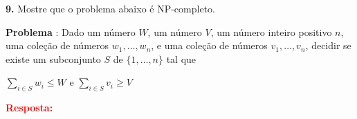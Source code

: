 
\noindent\textbf{9.} Mostre que o problema abaixo é NP-completo.

\indent\textbf{Problema} : Dado um número $W$, um número $V$, um número inteiro positivo $n$, uma coleção de números $w_1, \ldots , w_n$, e uma coleção de números $v_1, \ldots , v_n$, decidir se existe um subconjunto $S$ de $\{1, \ldots , n\}$ tal que

\begin{center}
$\sum_{i \in S}{w_i} \leq W$ e $\sum_{i \in S}{v_i} \geq V$
\end{center}
\textcolor{red}{\textbf{Resposta:}}